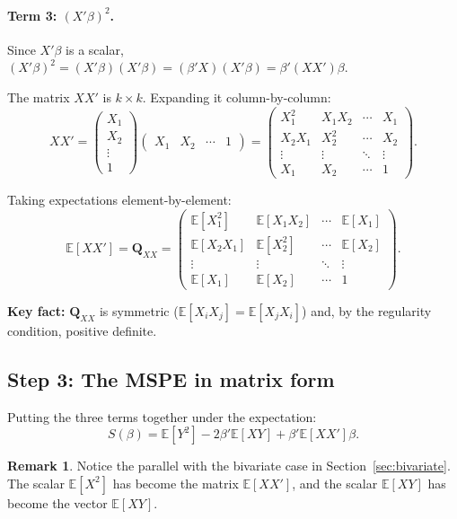 \documentclass[12pt]{article}
\newcommand{\E}{\mathbb{E}}
\newcommand{\bfQ}{\mathbf{Q}}
\theoremstyle{definition}
\newtheorem{remark}{Remark}
\begin{document}
\paragraph{Term 3: $(X'\beta)^2$.} Since $X'\beta$ is a scalar, $(X'\beta)^2 = (X'\beta)(X'\beta) = (\beta'X)(X'\beta) = \beta'(XX')\beta$.

The matrix $XX'$ is $k \times k$. Expanding it column-by-column:
\[
XX' = \begin{pmatrix} X_1 \\ X_2 \\ \vdots \\ 1 \end{pmatrix}
\begin{pmatrix} X_1 & X_2 & \cdots & 1 \end{pmatrix}
= \begin{pmatrix}
X_1^2 & X_1 X_2 & \cdots & X_1 \\
X_2 X_1 & X_2^2 & \cdots & X_2 \\
\vdots & \vdots & \ddots & \vdots \\
X_1 & X_2 & \cdots & 1
\end{pmatrix}.
\]

Taking expectations element-by-element:
\[
\E[XX'] = \bfQ_{XX} = \begin{pmatrix}
\E[X_1^2] & \E[X_1 X_2] & \cdots & \E[X_1] \\
\E[X_2 X_1] & \E[X_2^2] & \cdots & \E[X_2] \\
\vdots & \vdots & \ddots & \vdots \\
\E[X_1] & \E[X_2] & \cdots & 1
\end{pmatrix}.
\]

\textbf{Key fact:} $\bfQ_{XX}$ is symmetric ($\E[X_i X_j] = \E[X_j X_i]$) and, by the regularity condition, positive definite.

\subsection{Step 3: The MSPE in matrix form}

Putting the three terms together under the expectation:
\begin{equation}
S(\beta) = \E[Y^2] - 2\beta'\E[XY] + \beta'\E[XX']\beta. \label{eq:Smatrix}
\end{equation}

\begin{remark}
Notice the parallel with the bivariate case in Section~\ref{sec:bivariate}. The scalar $\E[X^2]$ has become the matrix $\E[XX']$, and the scalar $\E[XY]$ has become the vector $\E[XY]$.
\end{remark}
\end{document}

